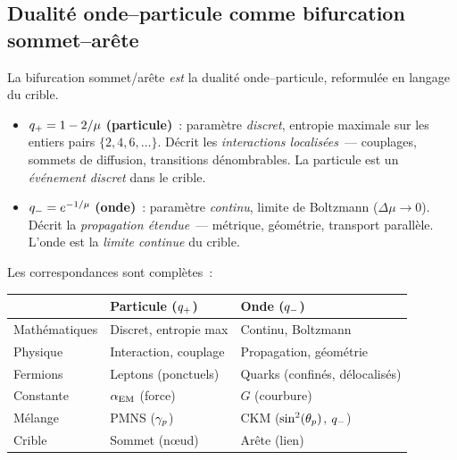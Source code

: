 \documentclass[12pt,a4paper]{article}
\begin{document}
\subsection{Dualité onde--particule comme bifurcation sommet--arête}
\label{sec:ch9_wave_particle}

La bifurcation sommet/arête \emph{est} la dualité onde--particule,
reformulée en langage du crible.

\mDER
\begin{derbox}
\label{der:wave_particle}
\begin{itemize}[nosep]
\item $q_{+} = 1 - 2/\mu$ \textbf{(particule)}~: paramètre
  \emph{discret}, entropie maximale sur les entiers pairs
  $\{2,4,6,\ldots\}$. Décrit les \emph{interactions
  localisées}~--- couplages, sommets de diffusion, transitions
  dénombrables. La particule est un \emph{événement discret} dans
  le crible.
\item $q_{-} = e^{-1/\mu}$ \textbf{(onde)}~: paramètre
  \emph{continu}, limite de Boltzmann ($\Delta\mu \to 0$). Décrit
  la \emph{propagation étendue}~--- métrique, géométrie, transport
  parallèle. L'onde est la \emph{limite continue} du crible.
\end{itemize}
\end{derbox}

Les correspondances sont complètes~:

\begin{center}
\small
\begin{tabular}{lll}
\toprule
 & \textbf{Particule} ($q_{+}$) & \textbf{Onde} ($q_{-}$) \\
\midrule
Mathématiques  & Discret, entropie max     & Continu, Boltzmann \\
Physique       & Interaction, couplage     & Propagation, géométrie \\
Fermions       & Leptons (ponctuels)       & Quarks (confinés, délocalisés) \\
Constante      & $\alpha_{\mathrm{EM}}$ (force)        & $G$ (courbure) \\
Mélange        & PMNS ($\gamma_{p}$)         & CKM ($\sin^2(\theta_{p})$, $q_{-}$) \\
Crible         & Sommet (n{\oe}ud)         & Arête (lien) \\
\bottomrule
\end{tabular}
\end{center}
\end{document}

